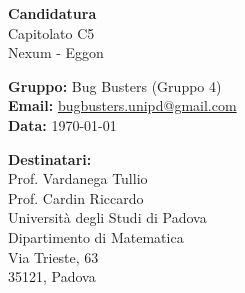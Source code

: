 \documentclass[a4paper,11pt]{article}
\begin{document}
\thispagestyle{empty}

\begin{tcolorbox}[
    colback=primarycolor!40,
    colframe=primarycolor!80,
    coltext=white,
    arc=3mm,
    boxrule=0pt,
    left=12pt,
    right=12pt,
    top=16pt,
    bottom=16pt
]
    \color{white}
    \begin{minipage}[c]{0.7\textwidth}
        {\Huge\bfseries Candidatura}\\[0.2cm]
        {\huge Capitolato C5}\\[0.3cm]
        {\Large Nexum - Eggon}
    \end{minipage}
    \hfill
    \begin{minipage}[c]{0.25\textwidth}
        \raggedleft
    \end{minipage}
\end{tcolorbox}

\vspace{1em}

\begin{tcolorbox}[
    colback=lightgray,
    colframe=lightgray,
    arc=3mm,
    boxrule=0pt,
    left=10pt,
    right=10pt,
    top=10pt,
    bottom=10pt
]
    \textbf{Gruppo:} Bug Busters (Gruppo 4)\\
    \textbf{Email:} \href{mailto:bugbusters.unipd@gmail.com}{bugbusters.unipd@gmail.com}\\
    \textbf{Data:} \today
\end{tcolorbox}

\vspace{2em}

\noindent
\textbf{Destinatari:}\\
Prof. Vardanega Tullio\\
Prof. Cardin Riccardo\\
Università degli Studi di Padova\\
Dipartimento di Matematica\\
Via Trieste, 63\\
35121, Padova
\end{document}
